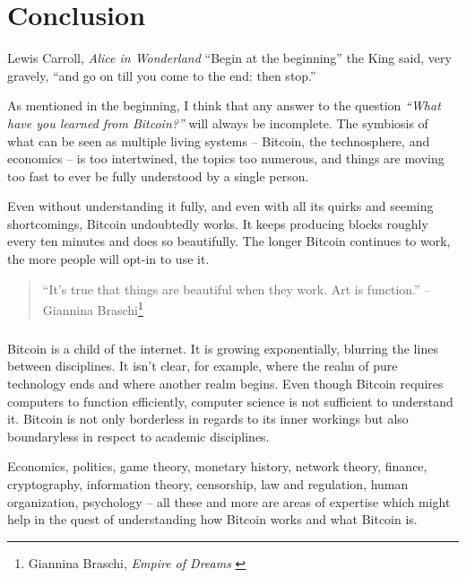 \label{ch:conclusion}

\chapter*{Conclusion}

\begin{chapquote}{Lewis Carroll, \textit{Alice in Wonderland}}
\enquote{Begin at the beginning} the King said, very gravely, \enquote{and go on till you
come to the end: then stop.}
\end{chapquote}

As mentioned in the beginning, I think that any answer to the
question \textit{“What have you learned from Bitcoin?”} will always be incomplete. The
symbiosis of what can be seen as multiple living systems -- Bitcoin, the
technosphere, and economics -- is too intertwined, the topics too numerous, and
things are moving too fast to ever be fully understood by a single person.

Even without understanding it fully, and even with all its quirks and seeming
shortcomings, Bitcoin undoubtedly works. It keeps producing blocks roughly every
ten minutes and does so beautifully. The longer Bitcoin continues to work, the
more people will opt-in to use it.

\begin{samepage}\begin{quotation}
\enquote{It's true that things are beautiful when they work. Art is function.}
\flushright -- Giannina Braschi\footnote{Giannina Braschi, \textit{Empire of Dreams} \cite{braschi2011empire}}
\end{quotation}\end{samepage}

\paragraph{} Bitcoin is a child of the internet. It is growing exponentially,
blurring the lines between disciplines. It isn’t clear, for example, where the
realm of pure technology ends and where another realm begins. Even though
Bitcoin requires computers to function efficiently, computer science is not
sufficient to understand it. Bitcoin is not only borderless in regards to its
inner workings but also boundaryless in respect to academic disciplines.

Economics, politics, game theory, monetary history, network theory, finance,
cryptography, information theory, censorship, law and regulation, human
organization, psychology -- all these and more are areas of expertise which might
help in the quest of understanding how Bitcoin works and what Bitcoin is.


